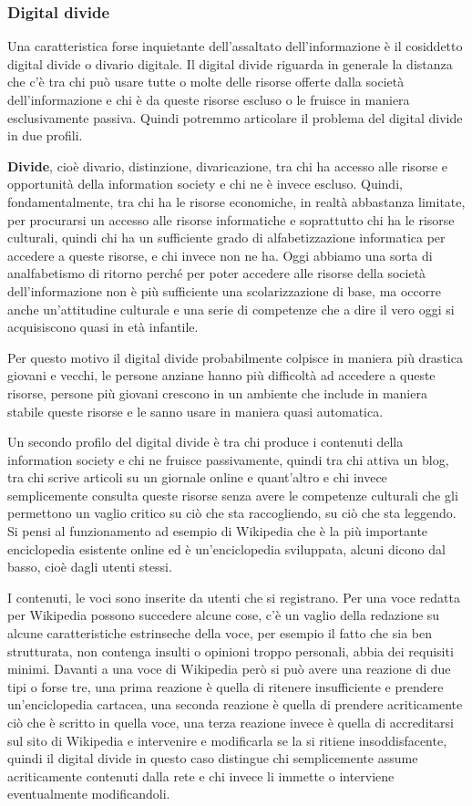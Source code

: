 \subsubsection*{Digital divide}
Una caratteristica forse inquietante dell'assaltato dell'informazione è il cosiddetto digital divide o divario digitale. 
Il digital divide riguarda in generale la distanza che c'è tra chi può usare tutte o molte delle risorse offerte dalla società dell'informazione e chi è da queste risorse escluso o le fruisce in maniera esclusivamente passiva. Quindi potremmo articolare il problema del digital divide in due profili.

\textbf{Divide}, cioè divario, distinzione, divaricazione, tra chi ha accesso alle risorse e opportunità della information society e chi ne è invece escluso. Quindi, fondamentalmente, tra chi ha le risorse economiche, in realtà abbastanza limitate, per procurarsi un accesso alle risorse informatiche e soprattutto chi ha le risorse culturali, quindi chi ha un sufficiente grado di alfabetizzazione informatica per accedere a queste risorse, e chi invece non ne ha. Oggi abbiamo una sorta di analfabetismo di ritorno perché per poter accedere alle risorse della società dell'informazione non è più sufficiente una scolarizzazione di base, ma occorre anche un'attitudine culturale e una serie di competenze che a dire il vero oggi si acquisiscono quasi in età infantile.

Per questo motivo il digital divide probabilmente colpisce in maniera più drastica giovani e vecchi, le persone anziane hanno più difficoltà ad accedere a queste risorse, persone più giovani crescono in un ambiente che include in maniera stabile queste risorse e le sanno usare in maniera quasi automatica.
 
Un secondo profilo del digital divide è tra chi produce i contenuti della information society e chi ne fruisce passivamente, quindi tra chi attiva un blog, tra chi scrive articoli su un giornale online e quant'altro e chi invece semplicemente consulta queste risorse senza avere le competenze culturali che gli permettono un vaglio critico su ciò che sta raccogliendo, su ciò che sta leggendo. Si pensi al funzionamento ad esempio di Wikipedia che è la più importante enciclopedia esistente online ed è un'enciclopedia sviluppata, alcuni dicono dal basso, cioè dagli utenti stessi. 

I contenuti, le voci sono inserite da utenti che si registrano. Per una voce redatta per Wikipedia possono succedere alcune cose, c'è un vaglio della redazione su alcune caratteristiche estrinseche della voce, per esempio il fatto che sia ben strutturata, non contenga insulti o opinioni troppo personali, abbia dei requisiti minimi. Davanti a una voce di Wikipedia però si può avere una reazione di due tipi o forse tre, una prima reazione è quella di ritenere insufficiente e prendere un'enciclopedia cartacea, una seconda reazione è quella di prendere acriticamente ciò che è scritto in quella voce, una terza reazione invece è quella di accreditarsi sul sito di Wikipedia e intervenire e modificarla se la si ritiene insoddisfacente, quindi il digital divide in questo caso distingue chi semplicemente assume acriticamente contenuti dalla rete e chi invece li immette o interviene eventualmente modificandoli.

